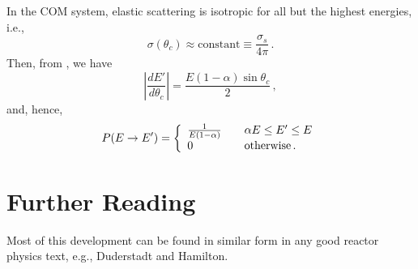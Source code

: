 In the COM system, elastic scattering is isotropic for all
but the highest energies, i.e.,
\begin{equation}
  \sigma(\theta_c) \approx \text{constant} \equiv \frac{\sigma_{s}}{4\pi} \, .
\end{equation}
Then, from , we have
\begin{equation}
 \left | \frac{dE'}{d\theta_c} \right | = \frac{ E (1-\alpha) \sin \theta_c}{2} \, ,
\end{equation}
and, hence, 
\begin{equation}
      P(E\to E') =
        \left\{
           \begin{array}{l l}
               \frac{1}{E(1-\alpha)} & \quad \alpha E \leq E' \leq E \\
               0                     & \quad \text{otherwise} \, .
            \end{array} 
        \right.
    \label{eq:scattermatrixappx}
\end{equation}

\section*{Further Reading}

Most of this development can be found in similar form in any good 
reactor physics text, e.g., Duderstadt and Hamilton\cite{duderstadt1976nra}.


